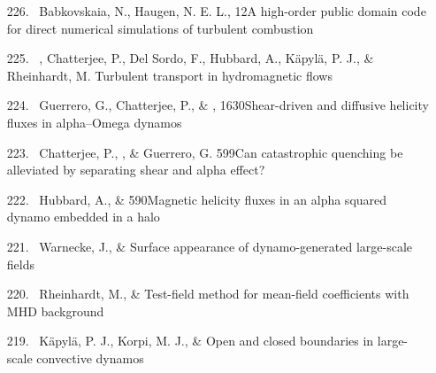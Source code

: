 \begin{itemize}
\item[{226.}~]
Babkovskaia, N., Haugen, N. E. L., \Brandenburg{}
{12}{A high-order public domain code for direct numerical simulations of turbulent combustion}

\item[{225.}~]
\Brandenburg, Chatterjee, P., Del Sordo, F., Hubbard, A., K\"apyl\"a, P. J., \& Rheinhardt, M.
{Turbulent transport in hydromagnetic flows}

\item[{224.}~]
Guerrero, G., Chatterjee, P., \& \Brandenburg,
{1630}{Shear-driven and diffusive helicity fluxes in alpha--Omega dynamos}

\item[{223.}~]
Chatterjee, P., \Brandenburg, \& Guerrero, G.
{599}{Can catastrophic quenching be alleviated by separating shear and alpha effect?}

\item[{222.}~]
Hubbard, A., \& \Brandenburg{}
{590}{Magnetic helicity fluxes in an alpha squared dynamo embedded in a halo}

\item[{221.}~]
Warnecke, J., \& \Brandenburg{}
{Surface appearance of dynamo-generated large-scale fields}

\item[{220.}~]
Rheinhardt, M., \& \Brandenburg{}
{Test-field method for mean-field coefficients with MHD background}

\item[{219.}~]
K\"apyl\"a, P. J., Korpi, M. J., \& \Brandenburg{}
{Open and closed boundaries in large-scale convective dynamos}


\end{itemize}
